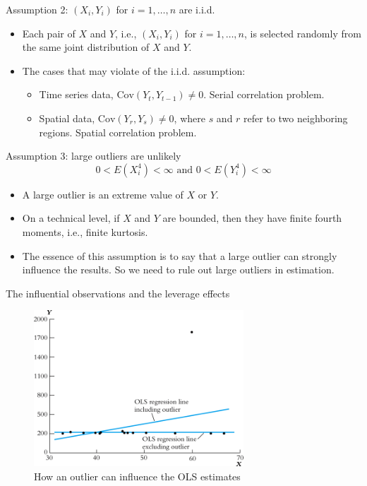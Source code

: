 \documentclass[presentation]{beamer}
\begin{document}
\begin{frame}[label={sec:org21e8a38}]{Assumption 2: \((X_i, Y_i)\) for \(i = 1, \ldots, n\) are i.i.d.}
\begin{itemize}
\item Each pair of \(X\) and \(Y\), i.e., \((X_i, Y_i)\) for \(i=1, \ldots, n\), is
selected randomly from the same joint distribution of \(X\) and \(Y\).

\item The cases that may violate of the i.i.d. assumption:
\begin{itemize}
\item Time series data, \(\mathrm{Cov}(Y_t, Y_{t-1}) \neq 0\). Serial
correlation problem.
\item Spatial data, \(\mathrm{Cov}(Y_r, Y_s) \neq 0\), where \(s\) and \(r\)
refer to two neighboring regions. Spatial correlation problem.
\end{itemize}
\end{itemize}
\end{frame}

\begin{frame}[label={sec:org15ebbd9}]{Assumption 3: large outliers are unlikely}
$$0 < E(X^4_i) < \infty \text{ and } 0 < E(Y_i^4) < \infty$$

\begin{itemize}
\item A large outlier is an extreme value of \(X\) or \(Y\).
\item On a technical level, if \(X\) and \(Y\) are bounded, then they have finite
fourth moments, i.e., finite kurtosis.
\item The essence of this assumption is to say that a large outlier can
strongly influence the results. So we need to rule out large
outliers in estimation.
\end{itemize}
\end{frame}

\begin{frame}[label={sec:org31f2154}]{The influential observations and the leverage effects}
\begin{figure}[htbp]
\centering
\includegraphics[width=0.7\textwidth]{figure/fig-4-5.png}
\caption{\label{fig:org0ec9b46}
How an outlier can influence the OLS estimates}
\end{figure}
\end{frame}
\end{document}
